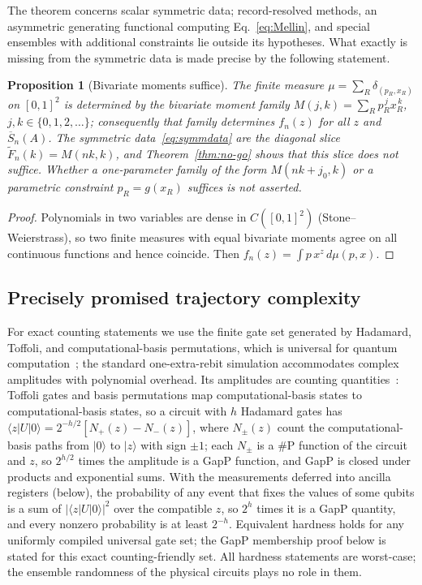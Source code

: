 \documentclass[aps,prx,reprint,superscriptaddress,nobibnotes,longbibliography]{revtex4-2}
\newtheorem{proposition}{Proposition}
\theoremstyle{remark}
\begin{document}
The theorem concerns scalar symmetric data; record-resolved methods, an asymmetric generating functional computing Eq.~\eqref{eq:Mellin}, and special ensembles with additional constraints lie outside its hypotheses.  What exactly is missing from the symmetric data is made precise by the following statement.

\begin{proposition}[Bivariate moments suffice]
\label{prop:bivariate}
The finite measure $\mu=\sum_R\delta_{(p_R,x_R)}$ on $[0,1]^2$ is determined by the bivariate moment family $M(j,k)=\sum_Rp_R^{\,j}x_R^{\,k}$, $j,k\in\{0,1,2,\ldots\}$; consequently that family determines $f_n(z)$ for all $z$ and $\overline S_n(A)$.  The symmetric data~\eqref{eq:symmdata} are the diagonal slice $\widetilde F_n(k)=M(nk,k)$, and Theorem~\ref{thm:no-go} shows that this slice does not suffice.  Whether a one-parameter family of the form $M(nk+j_0,k)$ or a parametric constraint $p_R=g(x_R)$ suffices is not asserted.
\end{proposition}

\begin{proof}
Polynomials in two variables are dense in $C([0,1]^2)$ (Stone--Weierstrass), so two finite measures with equal bivariate moments agree on all continuous functions and hence coincide.  Then $f_n(z)=\int p\,x^z\,d\mu(p,x)$.
\end{proof}

\subsection{Precisely promised trajectory complexity}

For exact counting statements we use the finite gate set generated by Hadamard, Toffoli, and computational-basis permutations, which is universal for quantum computation~\cite{Shi2003,Aharonov2003}; the standard one-extra-rebit simulation accommodates complex amplitudes with polynomial overhead.  Its amplitudes are counting quantities~\cite{Fenner1994}: Toffoli gates and basis permutations map computational-basis states to computational-basis states, so a circuit with $h$ Hadamard gates has $\langle z|U|0\rangle=2^{-h/2}[N_+(z)-N_-(z)]$, where $N_\pm(z)$ count the computational-basis paths from $|0\rangle$ to $|z\rangle$ with sign $\pm1$; each $N_\pm$ is a $\#$P function of the circuit and $z$, so $2^{h/2}$ times the amplitude is a GapP function, and GapP is closed under products and exponential sums.  With the measurements deferred into ancilla registers (below), the probability of any event that fixes the values of some qubits is a sum of $|\langle z|U|0\rangle|^2$ over the compatible $z$, so $2^h$ times it is a GapP quantity, and every nonzero probability is at least $2^{-h}$.  Equivalent hardness holds for any uniformly compiled universal gate set; the GapP membership proof below is stated for this exact counting-friendly set.  All hardness statements are worst-case; the ensemble randomness of the physical circuits plays no role in them.
\end{document}
